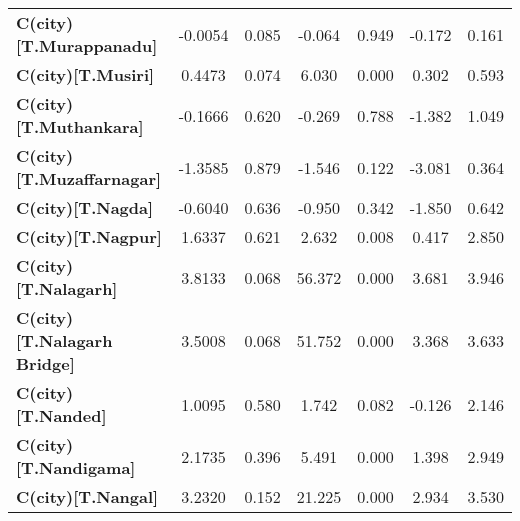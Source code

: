 \begin{center}
\begin{tabular}{lcccccc}
\textbf{C(city)[T.Murappanadu]}                                                                     &      -0.0054  &        0.085     &    -0.064  &         0.949        &       -0.172    &        0.161     \\
\textbf{C(city)[T.Musiri]}                                                                          &       0.4473  &        0.074     &     6.030  &         0.000        &        0.302    &        0.593     \\
\textbf{C(city)[T.Muthankara]}                                                                      &      -0.1666  &        0.620     &    -0.269  &         0.788        &       -1.382    &        1.049     \\
\textbf{C(city)[T.Muzaffarnagar]}                                                                   &      -1.3585  &        0.879     &    -1.546  &         0.122        &       -3.081    &        0.364     \\
\textbf{C(city)[T.Nagda]}                                                                           &      -0.6040  &        0.636     &    -0.950  &         0.342        &       -1.850    &        0.642     \\
\textbf{C(city)[T.Nagpur]}                                                                          &       1.6337  &        0.621     &     2.632  &         0.008        &        0.417    &        2.850     \\
\textbf{C(city)[T.Nalagarh]}                                                                        &       3.8133  &        0.068     &    56.372  &         0.000        &        3.681    &        3.946     \\
\textbf{C(city)[T.Nalagarh Bridge]}                                                                 &       3.5008  &        0.068     &    51.752  &         0.000        &        3.368    &        3.633     \\
\textbf{C(city)[T.Nanded]}                                                                          &       1.0095  &        0.580     &     1.742  &         0.082        &       -0.126    &        2.146     \\
\textbf{C(city)[T.Nandigama]}                                                                       &       2.1735  &        0.396     &     5.491  &         0.000        &        1.398    &        2.949     \\
\textbf{C(city)[T.Nangal]}                                                                          &       3.2320  &        0.152     &    21.225  &         0.000        &        2.934    &        3.530     \\

\end{tabular}
\end{center}
